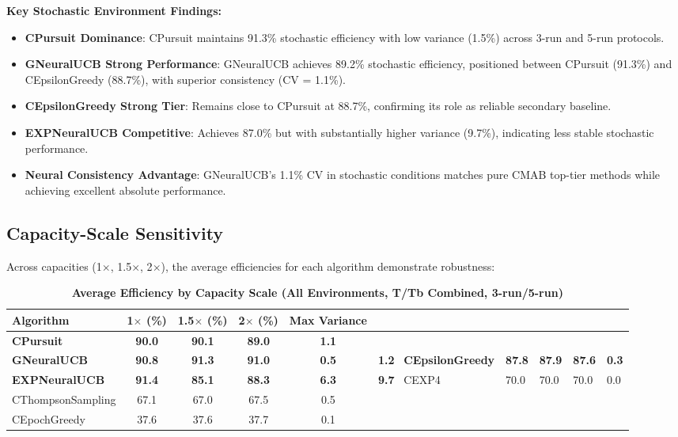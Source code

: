 \documentclass[12pt,a4paper]{article}
\newcommand{\performance}[1]{\textcolor{performancecolor}{\textbf{#1}}}
\newcommand{\stochastic}[1]{\textcolor{stochasticcolor}{\textbf{#1}}}
\newcommand{\legacy}[1]{\textcolor{legacycolor}{\textbf{#1}}}
\newcommand{\neural}[1]{\textcolor{neuralcolor}{\textbf{#1}}}
\begin{document}
\begin{tcolorbox}[colback=stochasticcolor!10,colframe=stochasticcolor,title=\textbf{Stochastic Environment Deep Analysis (1$\times$–2$\times$ Capacities, T/Tb Combined, 3-run/5-run)}]
\textbf{Key Stochastic Environment Findings:}
\begin{itemize}
\item \stochastic{CPursuit Dominance}: CPursuit maintains 91.3\% stochastic efficiency with low variance (1.5\%) across 3-run and 5-run protocols.
\item \neural{GNeuralUCB Strong Performance}: GNeuralUCB achieves 89.2\% stochastic efficiency, positioned between CPursuit (91.3\%) and CEpsilonGreedy (88.7\%), with superior consistency (CV = 1.1\%).
\item \performance{CEpsilonGreedy Strong Tier}: Remains close to CPursuit at 88.7\%, confirming its role as reliable secondary baseline.
\item \legacy{EXPNeuralUCB Competitive}: Achieves 87.0\% but with substantially higher variance (9.7\%), indicating less stable stochastic performance.
\item \neural{Neural Consistency Advantage}: GNeuralUCB's 1.1\% CV in stochastic conditions matches pure CMAB top-tier methods while achieving excellent absolute performance.
\end{itemize}

\end{tcolorbox}

\subsection{Capacity-Scale Sensitivity}

Across capacities (1$\times$, 1.5$\times$, 2$\times$), the average efficiencies for each algorithm demonstrate robustness:

\begin{table}[H]
\centering
\caption{\performance{Average Efficiency by Capacity Scale (All Environments, T/Tb Combined, 3-run/5-run)}}
\begin{tabular}{|l|c|c|c|c|}
\hline
\textbf{Algorithm} & \textbf{1$\times$ (\%)} & \textbf{1.5$\times$ (\%)} & \textbf{2$\times$ (\%)} & \textbf{Max Variance} \\
\hline
\hline
\performance{CPursuit}        & \performance{90.0} & \performance{90.1} & \performance{89.0} & \performance{1.1} \\
\neural{GNeuralUCB}          & \neural{90.8} & \neural{91.3} & \neural{91.0} & \neural{0.5} & \neural{1.2} \
\performance{CEpsilonGreedy} & \performance{87.8} & \performance{87.9} & \performance{87.6} & \performance{0.3} \\
\legacy{EXPNeuralUCB}          & \legacy{91.4} & \legacy{85.1} & \legacy{88.3} & \legacy{6.3} & \legacy{9.7} \
CEXP4                        & 70.0              & 70.0              & 70.0 & 0.0 \\
CThompsonSampling            & 67.1              & 67.0              & 67.5 & 0.5 \\
CEpochGreedy                 & 37.6              & 37.6              & 37.7 & 0.1 \\
\hline
\end{tabular}
\end{table}
\end{document}

